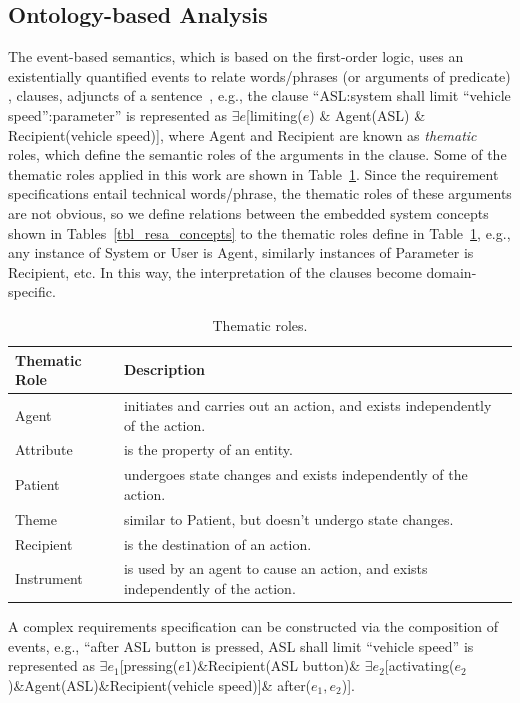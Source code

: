 \subsection{Ontology-based Analysis}
The event-based semantics, which is based on the first-order logic, uses an existentially quantified events to relate words/phrases (or arguments of predicate) , clauses, adjuncts of a sentence~\cite{Mahmud2017SpecificationLogic}, e.g., the clause ``ASL:system shall limit ``vehicle speed'':parameter'' is represented as $\exists e$[limiting($e$) \& Agent(ASL) \& Recipient(vehicle speed)], where Agent and Recipient are known as \textit{thematic} roles, which define the semantic roles of the arguments in the clause.  Some of the thematic roles applied in this work are shown in Table~\ref{tbl_thematic_roles}. Since the requirement specifications entail technical words/phrase, the thematic roles of these arguments are not obvious, so we define relations between the embedded system concepts shown in Tables~\ref{tbl_resa_concepts} to the thematic roles define in Table~\ref{tbl_thematic_roles}, e.g., any instance of System or User is Agent, similarly instances of Parameter is Recipient, etc. In this way, the interpretation of the clauses become domain-specific.
\begin{table}[h]\small
	\begin{tabular}{@{}lp{}@{}}
		\toprule
		Thematic Role & Description \\ \midrule
		Agent & initiates and carries out an action, and exists independently of the action. \\
		Attribute & is the property of an entity. \\
		Patient & undergoes state changes and exists independently of the action. \\
		Theme & similar to Patient, but doesn't undergo state changes. \\
		Recipient & is the destination of an action. \\
		Instrument & is used by an agent to cause an action, and exists independently of the action. \\ \bottomrule
	\end{tabular}
\caption{Thematic roles.}\label{tbl_thematic_roles}
\end{table}

A complex requirements specification can be constructed via the composition of events, e.g., ``after ASL button is pressed, ASL shall limit ``vehicle speed'' is represented as $\exists e_1$[pressing($e1$)\&Recipient(ASL button)\& $\exists e_2$[activating($e_2$)\&Agent(ASL)\&Recipient(vehicle speed)]\& after($e_1,e_2$)].

